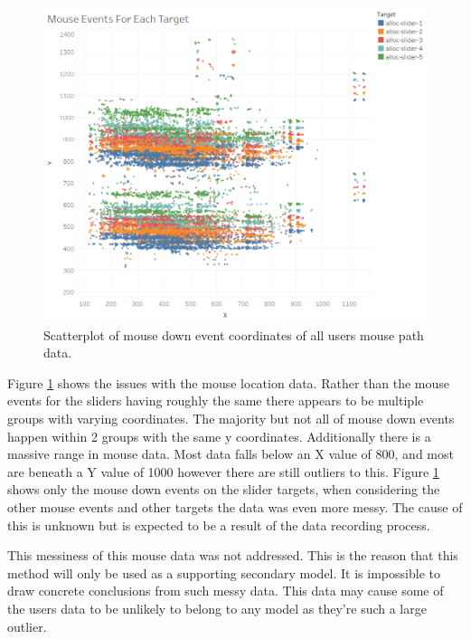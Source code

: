 \documentclass{article}
\begin{document}
\begin{figure}[ht!]
    \centering
    \includegraphics[scale=0.65]{Images/Mouse-Events-For-Each-Target.png}
    \caption{Scatterplot of mouse down event coordinates of all users mouse path data.}
    \label{fig:MouseEventsTargets}
\end{figure}

Figure \ref{fig:MouseEventsTargets} shows the issues with the mouse location data.
Rather than the mouse events for the sliders having roughly the same there appears to be multiple groups with varying coordinates.
The majority but not all of mouse down events happen within 2 groups with the same y coordinates. 
Additionally there is a massive range in mouse data.
Most data falls below an X value of 800, and most are beneath a Y value of 1000 however there are still outliers to this.
Figure \ref{fig:MouseEventsTargets} shows only the mouse down events on the slider targets, when considering the other mouse events and other targets the data was even more messy. 
The cause of this is unknown but is expected to be a result of the data recording process.

This messiness of this mouse data was not addressed.
This is the reason that this method will only be used as a supporting secondary model.
It is impossible to draw concrete conclusions from such messy data.
This data may cause some of the users data to be unlikely to belong to any model as they’re such a large outlier.
\end{document}
